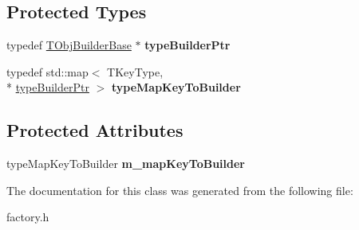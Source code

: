 \subsection*{Protected Types}
\begin{DoxyCompactItemize}
\item 
\hypertarget{class_t_obj_factory_a78f9a4fa0a63cf0c5e98e0c83ec26e3f}{typedef \hyperlink{class_t_obj_factory_1_1_t_obj_builder_base}{T\+Obj\+Builder\+Base} $\ast$ {\bfseries type\+Builder\+Ptr}}\label{class_t_obj_factory_a78f9a4fa0a63cf0c5e98e0c83ec26e3f}

\item 
\hypertarget{class_t_obj_factory_a5cfafa6011a8361bb82ccdc2675e1841}{typedef std\+::map$<$ T\+Key\+Type, \\*
\hyperlink{class_t_obj_factory_1_1_t_obj_builder_base}{type\+Builder\+Ptr} $>$ {\bfseries type\+Map\+Key\+To\+Builder}}\label{class_t_obj_factory_a5cfafa6011a8361bb82ccdc2675e1841}

\end{DoxyCompactItemize}
\subsection*{Protected Attributes}
\begin{DoxyCompactItemize}
\item 
\hypertarget{class_t_obj_factory_a88767aabcc9ea3e1524061bd9c2da99d}{type\+Map\+Key\+To\+Builder {\bfseries m\+\_\+map\+Key\+To\+Builder}}\label{class_t_obj_factory_a88767aabcc9ea3e1524061bd9c2da99d}

\end{DoxyCompactItemize}


The documentation for this class was generated from the following file\+:\begin{DoxyCompactItemize}
\item 
factory.\+h\end{DoxyCompactItemize}
